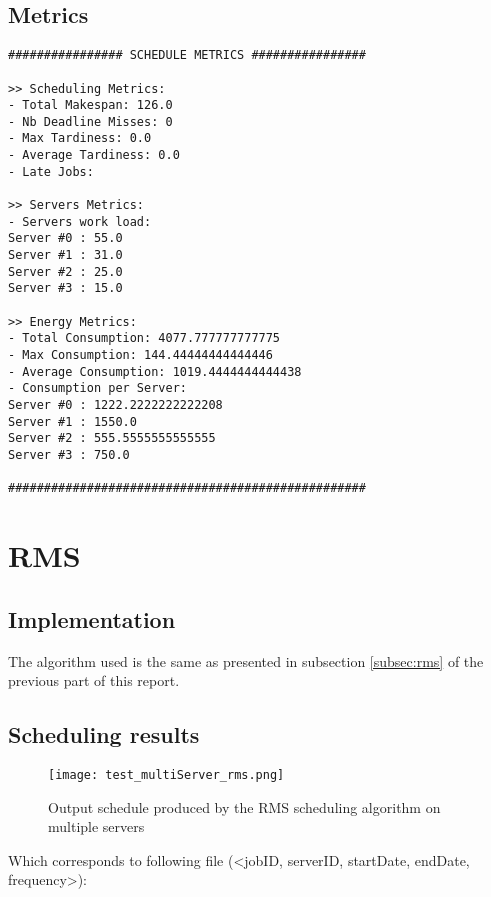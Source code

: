 \documentclass[./report.tex]{subfiles}
\begin{document}
\subsection{Metrics}
\begin{lstlisting}[style=txt, caption={Metrics for EDF on multiple servers}]
################ SCHEDULE METRICS ################

>> Scheduling Metrics: 
- Total Makespan: 126.0
- Nb Deadline Misses: 0
- Max Tardiness: 0.0
- Average Tardiness: 0.0
- Late Jobs: 

>> Servers Metrics: 
- Servers work load:
Server #0 : 55.0
Server #1 : 31.0
Server #2 : 25.0
Server #3 : 15.0

>> Energy Metrics: 
- Total Consumption: 4077.777777777775
- Max Consumption: 144.44444444444446
- Average Consumption: 1019.4444444444438
- Consumption per Server: 
Server #0 : 1222.2222222222208
Server #1 : 1550.0
Server #2 : 555.5555555555555
Server #3 : 750.0

##################################################
\end{lstlisting}


\newpage
\section{RMS}
\subsection{Implementation}
The algorithm used is the same as presented in subsection \ref{subsec:rms} of the previous part of this report.

\subsection{Scheduling results}
\begin{figure}[!h]
	\center
	\texttt{[image: test\_multiServer\_rms.png]}
	\caption{Output schedule produced by the RMS scheduling algorithm on multiple servers}
	\label{fig:multiServer_rms} 
\end{figure}

Which corresponds to following file (<jobID, serverID, startDate, endDate, frequency>):


\newpage
\end{document}
